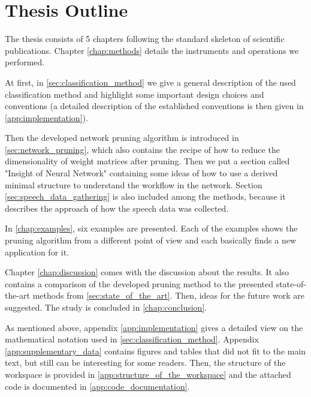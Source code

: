 \section{Thesis Outline} \label{sec:thesis_outline}
The thesis consists of 5 chapters following the standard skeleton of scientific publications. Chapter \ref{chap:methods} details the instruments and operations we performed. 

At first, in \cref{sec:classification_method} we give a general description of the used classification method and highlight some important design choices and conventions (a detailed description of the established conventions is then given in \cref{app:implementation}). 

Then the developed network pruning algorithm is introduced in \cref{sec:network_pruning}, which also contains the recipe of how to reduce the dimensionality of weight matrices after pruning. Then we put a section called "Insight of Neural Network" containing some ideas of how to use a derived minimal structure to understand the workflow in the network. Section \ref{sec:speech_data_gathering} is also included among the methods, because it describes the approach of how the speech data was collected.

In \cref{chap:examples}, six examples are presented. Each of the examples shows the pruning algorithm from a different point of view and each basically finds a new application for it.

Chapter \ref{chap:discussion} comes with the discussion about the results. It also contains a comparison of the developed pruning method to the presented state-of-the-art methods from \cref{sec:state_of_the_art}. Then, ideas for the future work are suggested. The study is concluded in \cref{chap:conclusion}.

As mentioned above, appendix \ref{app:implementation} gives a detailed view on the mathematical notation used in \cref{sec:classification_method}. Appendix \ref{app:supplementary_data} contains figures and tables that did not fit to the main text, but still can be interesting for some readers. Then, the structure of the workspace is provided in \cref{app:structure_of_the_workspace} and the attached code is documented in \cref{app:code_documentation}.